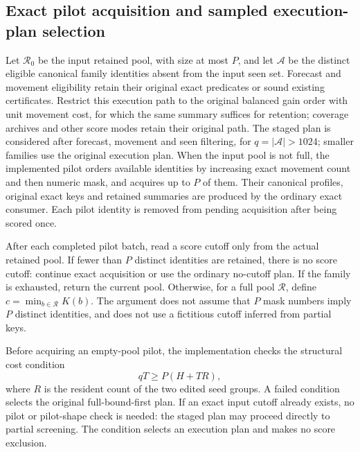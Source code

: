 \documentclass[11pt]{article}
\begin{document}
\subsection{Exact pilot acquisition and sampled execution-plan selection}
\label{sec:aggregate-pilot-composition}

Let $\mathcal R_0$ be the input retained pool, with size at most $P$, and let $\mathcal A$ be the distinct eligible canonical family identities absent from the input seen set. Forecast and movement eligibility retain their original exact predicates or sound existing certificates. Restrict this execution path to the original balanced gain order with unit movement cost, for which the same summary suffices for retention; coverage archives and other score modes retain their original path. The staged plan is considered after forecast, movement and seen filtering, for $q=|\mathcal A|>1024$; smaller families use the original execution plan. When the input pool is not full, the implemented pilot orders available identities by increasing exact movement count and then numeric mask, and acquires up to $P$ of them. Their canonical profiles, original exact keys and retained summaries are produced by the ordinary exact consumer. Each pilot identity is removed from pending acquisition after being scored once.

After each completed pilot batch, read a score cutoff only from the actual retained pool. If fewer than $P$ distinct identities are retained, there is no score cutoff: continue exact acquisition or use the ordinary no-cutoff plan. If the family is exhausted, return the current pool. Otherwise, for a full pool $\mathcal R$, define $c=\min_{b\in\mathcal R}K(b)$. The argument does not assume that $P$ mask numbers imply $P$ distinct identities, and does not use a fictitious cutoff inferred from partial keys.

Before acquiring an empty-pool pilot, the implementation checks the structural cost condition
\begin{equation}
qT\ge P(H+TR),
\label{eq:aggregate-pilot-shape}
\end{equation}
where $R$ is the resident count of the two edited seed groups. A failed condition selects the original full-bound-first plan. If an exact input cutoff already exists, no pilot or pilot-shape check is needed: the staged plan may proceed directly to partial screening. The condition selects an execution plan and makes no score exclusion.
\end{document}
